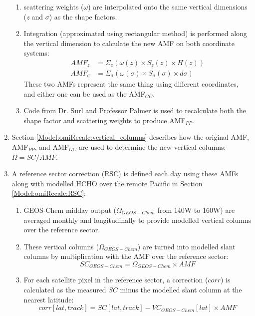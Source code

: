 \begin{enumerate}
\begin{enumerate}
        \item scattering weights ($\omega$) are interpolated onto the same vertical dimensions (\textit{z} and $\sigma$) as the shape factors.
        \item Integration (approximated using rectangular method) is performed along the vertical dimension to calculate the new AMF on both coordinate systems:
        \begin{align}
          AMF_z &= \Sigma_z \left(\omega(z) \times S_z(z) \times H(z)\right) \\
          AMF_{\sigma} &= \Sigma_{\sigma} \left(\omega(\sigma) \times S_{\sigma}(\sigma) \times d\sigma \right)
        \end{align}
        These two AMFs represent the same thing using different coordinates, and either one can be used as the AMF$_{GC}$.
        \item Code from Dr. Surl and Professor Palmer is used to recalculate both the shape factor and scattering weights to produce AMF$_{PP}$.
      \end{enumerate}
      \item Section \ref{Model:omiRecalc:vertical_columns} describes how the original AMF, AMF$_{PP}$, and AMF$_{GC}$ are used to determine the new vertical columns: $\Omega = SC/AMF$.
      \item A reference sector correction (RSC) is defined each day using these AMFs along with modelled HCHO over the remote Pacific in Section \ref{Model:omiRecalc:RSC}:
      \begin{enumerate}
        \item GEOS-Chem midday output ($\Omega_{GEOS-Chem}$ from 140{\degr}W to 160{\degr}W) are averaged monthly and longitudinally to provide modelled vertical columns over the reference sector.
        \item These vertical columns ($\Omega_{GEOS-Chem}$) are turned into modelled slant columns by multiplication with the AMF over the reference sector:
        \begin{equation*}
          SC_{GEOS-Chem} = \Omega_{GEOS-Chem} \times AMF
        \end{equation*}
        \item For each satellite pixel in the reference sector, a correction ($corr$) is calculated as the measured $SC$ minus the modelled slant column at the nearest latitude:
        \begin{equation*}
          corr[lat,track] = SC[lat,track] - VC_{GEOS-Chem}[lat] \times AMF
        \end{equation*}

\end{enumerate}
\end{enumerate}
